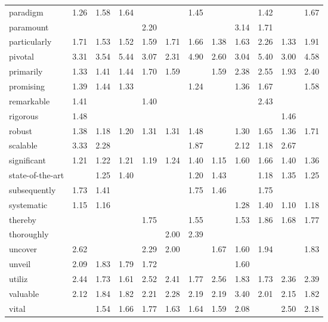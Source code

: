\begin{tabular}{lrrrrrrrrrrr}
paradigm & 1.26 & 1.58 & 1.64 &  &  & 1.45 &  &  & 1.42 &  & 1.67 \\
paramount &  &  &  & 2.20 &  &  &  & 3.14 & 1.71 &  &  \\
particularly & 1.71 & 1.53 & 1.52 & 1.59 & 1.71 & 1.66 & 1.38 & 1.63 & 2.26 & 1.33 & 1.91 \\
pivotal & 3.31 & 3.54 & 5.44 & 3.07 & 2.31 & 4.90 & 2.60 & 3.04 & 5.40 & 3.00 & 4.58 \\
primarily & 1.33 & 1.41 & 1.44 & 1.70 & 1.59 &  & 1.59 & 2.38 & 2.55 & 1.93 & 2.40 \\
promising & 1.39 & 1.44 & 1.33 &  &  & 1.24 &  & 1.36 & 1.67 &  & 1.58 \\
remarkable & 1.41 &  &  & 1.40 &  &  &  &  & 2.43 &  &  \\
rigorous & 1.48 &  &  &  &  &  &  &  &  & 1.46 &  \\
robust & 1.38 & 1.18 & 1.20 & 1.31 & 1.31 & 1.48 &  & 1.30 & 1.65 & 1.36 & 1.71 \\
scalable & 3.33 & 2.28 &  &  &  & 1.87 &  & 2.12 & 1.18 & 2.67 &  \\
significant & 1.21 & 1.22 & 1.21 & 1.19 & 1.24 & 1.40 & 1.15 & 1.60 & 1.66 & 1.40 & 1.36 \\
state-of-the-art &  & 1.25 & 1.40 &  &  & 1.20 & 1.43 &  & 1.18 & 1.35 & 1.25 \\
subsequently & 1.73 & 1.41 &  &  &  & 1.75 & 1.46 &  & 1.75 &  &  \\
systematic & 1.15 & 1.16 &  &  &  &  &  & 1.28 & 1.40 & 1.10 & 1.18 \\
thereby &  &  &  & 1.75 &  & 1.55 &  & 1.53 & 1.86 & 1.68 & 1.77 \\
thoroughly &  &  &  &  & 2.00 & 2.39 &  &  &  &  &  \\
uncover & 2.62 &  &  & 2.29 & 2.00 &  & 1.67 & 1.60 & 1.94 &  & 1.83 \\
unveil & 2.09 & 1.83 & 1.79 & 1.72 &  &  &  & 1.60 &  &  &  \\
utiliz & 2.44 & 1.73 & 1.61 & 2.52 & 2.41 & 1.77 & 2.56 & 1.83 & 1.73 & 2.36 & 2.39 \\
valuable & 2.12 & 1.84 & 1.82 & 2.21 & 2.28 & 2.19 & 2.19 & 3.40 & 2.01 & 2.15 & 1.82 \\
vital &  & 1.54 & 1.66 & 1.77 & 1.63 & 1.64 & 1.59 & 2.08 &  & 2.50 & 2.18 \\
\bottomrule
\end{tabular}
